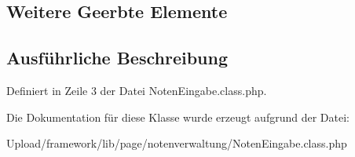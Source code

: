 \subsection*{Weitere Geerbte Elemente}


\subsection{Ausführliche Beschreibung}


Definiert in Zeile 3 der Datei Noten\+Eingabe.\+class.\+php.



Die Dokumentation für diese Klasse wurde erzeugt aufgrund der Datei\+:\begin{DoxyCompactItemize}
\item 
Upload/framework/lib/page/notenverwaltung/Noten\+Eingabe.\+class.\+php\end{DoxyCompactItemize}
